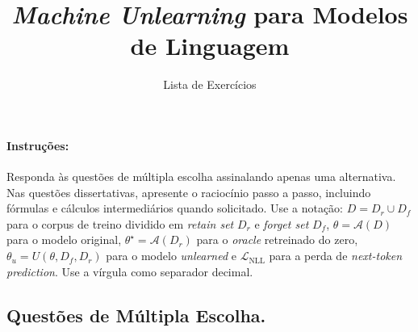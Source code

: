\documentclass{dlproblemset}
\title{\textit{Machine Unlearning} para Modelos de Linguagem}
\subtitle{Lista de Exercícios}
\begin{document}
\paragraph{Instruções:} Responda às questões de múltipla escolha assinalando apenas uma alternativa. Nas questões dissertativas, apresente o raciocínio passo a passo, incluindo fórmulas e cálculos intermediários quando solicitado. Use a notação: $D = D_r \cup D_f$ para o corpus de treino dividido em \textit{retain set} $D_r$ e \textit{forget set} $D_f$, $\theta = \mathcal{A}(D)$ para o modelo original, $\theta^\star = \mathcal{A}(D_r)$ para o \textit{oracle} retreinado do zero, $\theta_u = U(\theta, D_f, D_r)$ para o modelo \textit{unlearned} e $\mathcal{L}_{\text{NLL}}$ para a perda de \textit{next-token prediction}. Use a vírgula como separador decimal.

\subsection*{Questões de Múltipla Escolha.}
\end{document}
